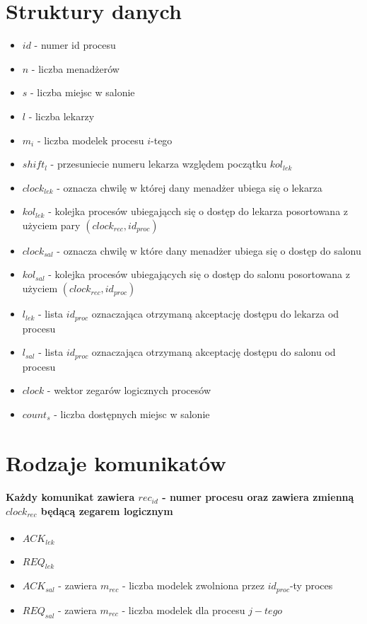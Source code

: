 \documentclass{article}
\begin{document}
\section{Struktury danych}
\begin{itemize}
\item{$id$ - numer id procesu}
\item{$n$ - liczba menadżerów}
\item{$s$ - liczba miejsc w salonie}
\item{$l$ - liczba lekarzy}
\item{$m_i$ - liczba modelek procesu $i$-tego}
\item {$shift_l$ - przesuniecie numeru lekarza względem początku $kol_{lek}$}
\item{$clock_{lek}$ - oznacza chwilę w której dany menadżer ubiega się o lekarza}
\item{$kol_{lek}$ - kolejka procesów ubiegającch się o dostęp do lekarza posortowana z użyciem pary $(clock_{rec}, id_{proc})$}
\item $clock_{sal}$ - oznacza chwilę w które dany menadżer ubiega się o dostęp do salonu
\item{$kol_{sal}$ - kolejka procesów ubiegających się o dostęp do salonu posortowana z użyciem $(clock_{rec}, id_{proc})$}
\item{$l_{lek}$ - lista $id_{proc}$ oznaczająca otrzymaną akceptację dostępu do lekarza od procesu}
\item{$l_{sal}$ - lista $id_{proc}$ oznaczająca otrzymaną akceptację dostępu do salonu od procesu}
\item{$clock$} - wektor zegarów logicznych procesów
\item{$count_{s}$ - liczba dostępnych miejsc w salonie}
\end{itemize}
\section{Rodzaje komunikatów}
\paragraph{Każdy komunikat zawiera $rec_{id}$ - numer procesu oraz zawiera zmienną $clock_{rec}$ będącą zegarem logicznym}
\begin{itemize}
\item{$ACK_{lek}$}
\item{$REQ_{lek}$}
\item{$ACK_{sal}$ - zawiera $m_{rec}$ - liczba modelek zwolniona przez $id_{proc}$-ty proces}
\item{$REQ_{sal}$ - zawiera $m_{rec}$ - liczba modelek dla procesu $j-tego$}
\end{itemize}
\end{document}
